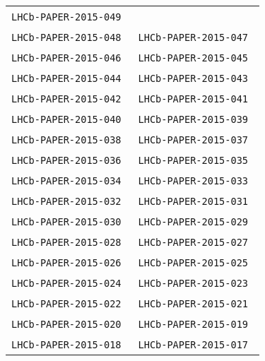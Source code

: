 \begin{center}
\begin{longtable}{ll}
\texttt{LHCb-PAPER-2015-049}~\cite{LHCb-PAPER-2015-049} \\
\texttt{LHCb-PAPER-2015-048}~\cite{LHCb-PAPER-2015-048} &
\texttt{LHCb-PAPER-2015-047}~\cite{LHCb-PAPER-2015-047} \\
\texttt{LHCb-PAPER-2015-046}~\cite{LHCb-PAPER-2015-046} &
\texttt{LHCb-PAPER-2015-045}~\cite{LHCb-PAPER-2015-045} \\
\texttt{LHCb-PAPER-2015-044}~\cite{LHCb-PAPER-2015-044} &
\texttt{LHCb-PAPER-2015-043}~\cite{LHCb-PAPER-2015-043} \\
\texttt{LHCb-PAPER-2015-042}~\cite{LHCb-PAPER-2015-042} &
\texttt{LHCb-PAPER-2015-041}~\cite{LHCb-PAPER-2015-041} \\
\texttt{LHCb-PAPER-2015-040}~\cite{LHCb-PAPER-2015-040} &
\texttt{LHCb-PAPER-2015-039}~\cite{LHCb-PAPER-2015-039} \\
\texttt{LHCb-PAPER-2015-038}~\cite{LHCb-PAPER-2015-038} &
\texttt{LHCb-PAPER-2015-037}~\cite{LHCb-PAPER-2015-037} \\
\texttt{LHCb-PAPER-2015-036}~\cite{LHCb-PAPER-2015-036} &
\texttt{LHCb-PAPER-2015-035}~\cite{LHCb-PAPER-2015-035} \\
\texttt{LHCb-PAPER-2015-034}~\cite{LHCb-PAPER-2015-034} &
\texttt{LHCb-PAPER-2015-033}~\cite{LHCb-PAPER-2015-033} \\
\texttt{LHCb-PAPER-2015-032}~\cite{LHCb-PAPER-2015-032} &
\texttt{LHCb-PAPER-2015-031}~\cite{LHCb-PAPER-2015-031} \\
\texttt{LHCb-PAPER-2015-030}~\cite{LHCb-PAPER-2015-030} &
\texttt{LHCb-PAPER-2015-029}~\cite{LHCb-PAPER-2015-029} \\
\texttt{LHCb-PAPER-2015-028}~\cite{LHCb-PAPER-2015-028} &
\texttt{LHCb-PAPER-2015-027}~\cite{LHCb-PAPER-2015-027} \\
\texttt{LHCb-PAPER-2015-026}~\cite{LHCb-PAPER-2015-026} &
\texttt{LHCb-PAPER-2015-025}~\cite{LHCb-PAPER-2015-025} \\
\texttt{LHCb-PAPER-2015-024}~\cite{LHCb-PAPER-2015-024} &
\texttt{LHCb-PAPER-2015-023}~\cite{LHCb-PAPER-2015-023} \\
\texttt{LHCb-PAPER-2015-022}~\cite{LHCb-PAPER-2015-022} &
\texttt{LHCb-PAPER-2015-021}~\cite{LHCb-PAPER-2015-021} \\
\texttt{LHCb-PAPER-2015-020}~\cite{LHCb-PAPER-2015-020} &
\texttt{LHCb-PAPER-2015-019}~\cite{LHCb-PAPER-2015-019} \\
\texttt{LHCb-PAPER-2015-018}~\cite{LHCb-PAPER-2015-018} &
\texttt{LHCb-PAPER-2015-017}~\cite{LHCb-PAPER-2015-017} \\

\end{longtable}
\end{center}
